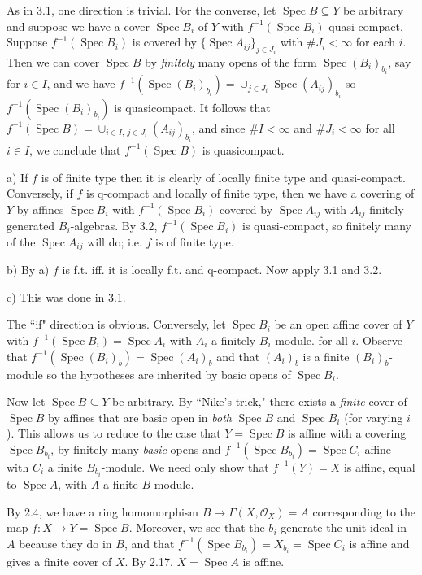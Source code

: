 \documentclass{report}
\renewcommand{\O}{\mathcal{O}}
\DeclareMathOperator{\Spec}{Spec}
\begin{document}
\bigskip
{}	As in 3.1, one direction is trivial.  For the converse, let $\Spec B\subseteq Y$ be arbitrary and suppose
we have a cover $\Spec B_i$ of $Y$ with $f^{-1}(\Spec B_i)$ quasi-compact.  Suppose $f^{-1}(\Spec B_i)$
is covered by $\{\Spec A_{ij}\}_{j\in J_i}$ with $\#J_i<\infty$ for each $i$.
Then we can cover $\Spec B$ by {\em finitely}	many opens of the form $\Spec (B_i)_{b_i}$, say for $i\in I$, and we have
$f^{-1}(\Spec (B_i)_{b_i})=\cup_{j\in J_i} \Spec (A_{ij})_{b_i}$ so $f^{-1}(\Spec (B_i)_{b_i})$ is quasicompact.
It follows that $f^{-1}(\Spec B)=\cup_{i\in I,\ j\in J_i} (A_{ij})_{b_i}$, and since $\#I<\infty$ and $\#J_i<\infty$ for all $i\in I$,
we conclude that $f^{-1}(\Spec B)$ is quasicompact.
		
\bigskip
{}	a)	If $f$ is of finite type then it is clearly of locally finite type and quasi-compact.	Conversely, 
if $f$ is q-compact and locally of finite type, then we have a covering of $Y$ by affines $\Spec B_i$
with $f^{-1}(\Spec B_i)$ covered by $\Spec A_{ij}$ with $A_{ij}$ finitely generated $B_i$-algebras.
By 3.2, $f^{-1}(\Spec B_i)$ is quasi-compact, so finitely many of the $\Spec A_{ij}$ will do; i.e.
$f$ is of finite type.


\noindent
b)	By a) $f$ is f.t. iff. it is locally f.t. and q-compact.  Now apply 3.1 and 3.2.

\noindent
c)	This was done in 3.1.

\bigskip
{}	The ``if" direction is obvious.  Conversely, let $\Spec B_i$ be an open affine cover of $Y$
with $f^{-1}(\Spec B_i)=\Spec A_{i}$ with $A_{i}$ a finitely $B_i$-module.
for all $i$.  Observe that $f^{-1}(\Spec (B_i)_b)=\Spec (A_{i})_b$
and that
$(A_{i})_b$ is a finite $(B_i)_b$-module so the hypotheses are inherited by basic opens
of $\Spec B_i$.	

Now let $\Spec B\subseteq Y$ be arbitrary.  By ``Nike's trick," there exists a {\em finite} cover of $\Spec B$ by affines
that are basic open in {\em both} $\Spec B$ and $\Spec B_i$ (for varying $i$).
This allows us to reduce to the case that $Y=\Spec B$ is affine with a covering $\Spec B_{b_i}$,
by finitely many {\em basic} opens and $f^{-1}(\Spec B_{b_i})=\Spec C_i$ affine with $C_i$ a finite $B_{b_i}$-module.
We need only show that  $f^{-1}(Y)=X$ is affine, equal to $\Spec A$, with $A$ a finite  $B$-module.

By 2.4, we have a ring homomorphism $B\rightarrow \Gamma(X,\O_X)=A$ corresponding to the map $f:X\rightarrow Y=\Spec B$.
Moreover, we see that the $b_i$ generate the unit ideal in $A$
because they do in $B$, and that  $f^{-1}(\Spec B_{b_i})=X_{b_i}=\Spec C_i$ is affine and gives
a finite cover of $X$.  By 2.17, $X=\Spec A$ is affine.
\end{document}
